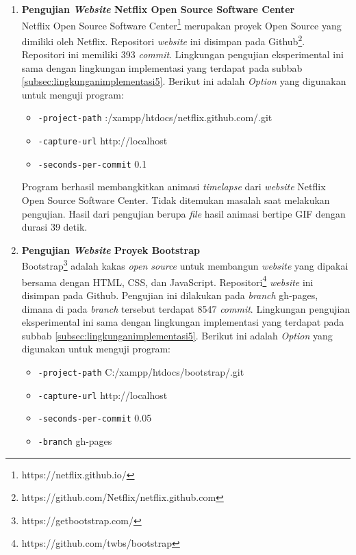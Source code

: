 \begin{enumerate}
\item \textbf{Pengujian \textit{Website} Netflix Open Source Software Center}\\
Netflix Open Source Software Center\footnote{https://netflix.github.io/} merupakan proyek Open Source yang dimiliki oleh Netflix. Repositori \textit{website} ini disimpan pada Github\footnote{https://github.com/Netflix/netflix.github.com}. Repositori ini memiliki 393 \textit{commit}. Lingkungan pengujian eksperimental ini sama dengan lingkungan implementasi yang terdapat pada subbab \ref{subsec:lingkunganimplementasi5}. Berikut ini adalah \textit{Option} yang digunakan untuk menguji program:
\begin{itemize}
\item \texttt{-project-path} :/xampp/htdocs/netflix.github.com/.git
\item \texttt{-capture-url} http://localhost
\item \texttt{-seconds-per-commit} 0.1 
\end{itemize}
Program berhasil membangkitkan animasi \textit{timelapse} dari \textit{website} Netflix Open Source Software Center. Tidak ditemukan masalah saat melakukan pengujian. Hasil dari pengujian berupa \textit{file} hasil animasi bertipe GIF dengan durasi 39 detik.


\item \textbf{Pengujian \textit{Website} Proyek Bootstrap}\\
Bootstrap\footnote{https://getbootstrap.com/} adalah kakas \textit{open source} untuk membangun \textit{website} yang dipakai bersama dengan HTML, CSS, dan JavaScript. Repositori\footnote{https://github.com/twbs/bootstrap} \textit{website} ini disimpan pada Github. Pengujian ini dilakukan pada \textit{branch} gh-pages, dimana di pada \textit{branch} tersebut terdapat 8547 \textit{commit}. Lingkungan pengujian eksperimental ini sama dengan lingkungan implementasi yang terdapat pada subbab \ref{subsec:lingkunganimplementasi5}. 
Berikut ini adalah \textit{Option} yang digunakan untuk menguji program:
\begin{itemize}
\item \texttt{-project-path} C:/xampp/htdocs/bootstrap/.git
\item \texttt{-capture-url} http://localhost
\item \texttt{-seconds-per-commit} 0.05 
\item \texttt{-branch} gh-pages
\end{itemize}


\end{enumerate}
